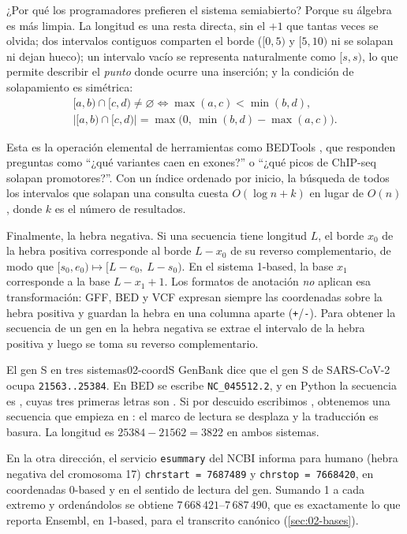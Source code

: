 ¿Por qué los programadores prefieren el sistema semiabierto? Porque su álgebra es más limpia. La longitud es una resta directa, sin el $+1$ que tantas veces se olvida; dos intervalos contiguos comparten el borde ($[0,5)$ y $[5,10)$ ni se solapan ni dejan hueco); un intervalo vacío se representa naturalmente como $[s,s)$, lo que permite describir el \emph{punto} donde ocurre una inserción; y la condición de solapamiento es simétrica:
\begin{gather}
[a,b) \cap [c,d) \neq \varnothing \iff \max(a,c) < \min(b,d), \label{eq:02-solape}\\
\bigl|[a,b)\cap[c,d)\bigr| = \max\bigl(0,\ \min(b,d)-\max(a,c)\bigr). \label{eq:02-solape-long}
\end{gather}
\begin{simbolos}
\simbolo{$[a,b),\ [c,d)$}{Dos intervalos semiabiertos en el mismo cromosoma.}
\end{simbolos}
Esta es la operación elemental de herramientas como BEDTools \parencite{c02-quinlan2010}, que responden preguntas como ``¿qué variantes caen en exones?'' o ``¿qué picos de ChIP-seq solapan promotores?''. Con un índice ordenado por inicio, la búsqueda de todos los intervalos que solapan una consulta cuesta $O(\log n + k)$ en lugar de $O(n)$, donde $k$ es el número de resultados.

Finalmente, la hebra negativa. Si una secuencia tiene longitud $L$, el borde $x_0$ de la hebra positiva corresponde al borde $L-x_0$ de su reverso complementario, de modo que $[s_0,e_0) \mapsto [L-e_0,\ L-s_0)$. En el sistema 1-based, la base $x_1$ corresponde a la base $L-x_1+1$. Los formatos de anotación \emph{no} aplican esa transformación: GFF, BED y VCF expresan siempre las coordenadas sobre la hebra positiva y guardan la hebra en una columna aparte (\texttt{+}/\texttt{-}). Para obtener la secuencia de un gen en la hebra negativa se extrae el intervalo de la hebra positiva y luego se toma su reverso complementario.

\begin{ejemplo}{El gen S en tres sistemas}{02-coordS}
GenBank dice que el gen S de SARS-CoV-2 ocupa \texttt{21563..25384}. En BED se escribe \texttt{NC\_045512.2}, y en Python la secuencia es , cuyas tres primeras letras son . Si por descuido escribimos , obtenemos una secuencia que empieza en : el marco de lectura se desplaza y la traducción es basura. La longitud es $25384-21562=3822$ en ambos sistemas.

En la otra dirección, el servicio \texttt{esummary} del NCBI informa para  humano (hebra negativa del cromosoma 17) \texttt{chrstart = 7687489} y \texttt{chrstop = 7668420}, en coordenadas 0-based y en el sentido de lectura del gen. Sumando 1 a cada extremo y ordenándolos se obtiene $7\,668\,421$–$7\,687\,490$, que es exactamente lo que reporta Ensembl, en 1-based, para el transcrito canónico (\cref{sec:02-bases}).
\end{ejemplo}

